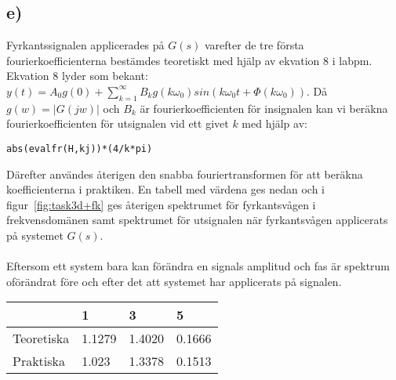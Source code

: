 \subsection*{e)}
Fyrkantssignalen applicerades på $G(s)$ varefter de tre första
fourierkoefficienterna bestämdes teoretiskt med hjälp av ekvation 8 i labpm.
Ekvation 8 lyder som bekant: $y(t) = A_0 g(0) + \sum_{k=1}^{\infty} B_k
g(k\omega_0)sin(k\omega_0t+\Phi(k\omega_0))$. Då $g(w) = |G(jw)|$ och $B_k$ är
fourierkoefficienten för insignalen kan vi beräkna fourierkoefficienten för
utsignalen vid ett givet $k$ med hjälp av:

\begin{lstlisting}
abs(evalfr(H,kj))*(4/k*pi)
\end{lstlisting}

Därefter användes återigen den snabba fouriertransformen för att beräkna
koefficienterna i praktiken. En tabell med värdena ges nedan och i
figur~\ref{fig:task3d+fk} ges återigen spektrumet för fyrkantsvågen i
frekvensdomänen samt spektrumet för utsignalen när fyrkantsvågen applicerats på
systemet $G(s)$.\\\\
Eftersom ett system bara kan förändra en signals amplitud och fas är spektrum
oförändrat före och efter det att systemet har applicerats på signalen.

\begin{tabular}{| l | l | l | l |}
    \hline
     & 1 & 3 & 5 \\ \hline
    Teoretiska & 1.1279 & 1.4020 & 0.1666 \\ \hline
    Praktiska & 1.023 & 1.3378 & 0.1513 \\ \hline
\end{tabular}
